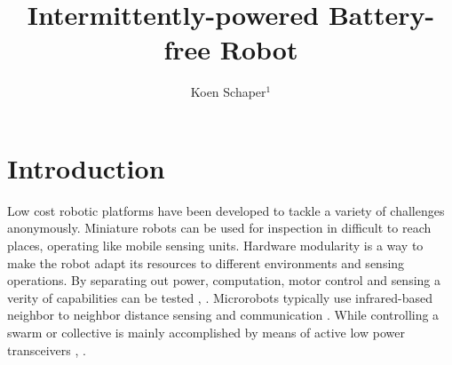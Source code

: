 \documentclass[letterpaper, 10 pt, conference]{ieeeconf}  %
\title{\LARGE \bf
Intermittently-powered Battery-free Robot
}
\author{Koen Schaper$^{1}$ %
}
\begin{document}
\maketitle
\thispagestyle{empty}
\pagestyle{empty}






\section{Introduction}



Low cost robotic platforms have been developed to tackle a variety of challenges anonymously.
Miniature robots can be used for inspection in difficult to reach places, operating like mobile sensing units.
Hardware modularity is a way to make the robot adapt its resources to different environments and sensing operations.
By separating out power, computation, motor control and sensing a verity of capabilities can be tested \cite{sabelhaus_icra_2013}, \cite{pickem_icra_2015}.
Microrobots typically use infrared-based neighbor to neighbor distance sensing and communication \cite{rubenstein_icra_2012}.
While controlling a swarm or collective is mainly accomplished by means of active low power transceivers \cite{sabelhaus_icra_2013}, \cite{pickem_icra_2015}. 

\end{document}

